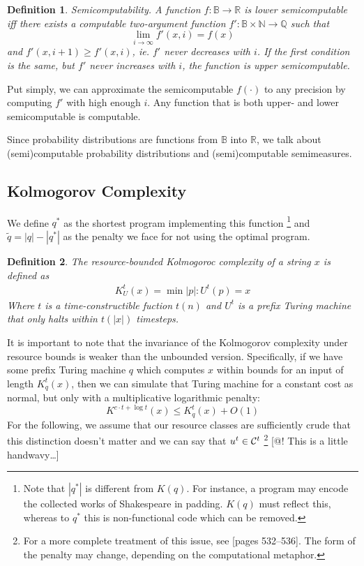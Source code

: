 \documentclass[10pt,a4paper,oneside]{article}
\newtheorem{dfn}{Definition}
\begin{document}
\begin{dfn}
Semicomputability. A function $f : {\mathbb B} \rightarrow {\mathbb R}$ is \emph{lower semicomputable} iff there exists a computable two-argument function $f': {\mathbb B} \times {\mathbb N} \rightarrow \mathbb Q$ such that  
\[
\lim_{i \rightarrow \infty} f'(x, i) = f(x)
\] and $f'(x, i + 1) \geq f'(x, i)$, ie. $f'$ never decreases with $i$. If the first condition is the same, but $f'$ never \emph{increases} with $i$, the function is \emph{upper semicomputable}.
\end{dfn}

Put simply, we can approximate the semicomputable $f(\cdot)$ to any precision by computing $f'$ with high enough $i$. Any function that is both upper- and lower semicomputable is computable.

Since probability distributions are functions from $\mathbb B$ into $\mathbb R$, we talk about (semi)computable probability distributions and (semi)computable semimeasures.

\subsection*{Kolmogorov Complexity}

We define $q^*$ as the shortest program implementing this function \footnote{Note that $|q^*|$ is different from $K(q)$. For instance, a program may encode the collected works of Shakespeare in padding. $K(q)$ must reflect this, whereas to $q^*$ this is non-functional code which can be removed.} and $\tilde{q} = |q| - |q^*|$ as the penalty we face for not using the optimal program.

\begin{dfn}
The \emph{resource-bounded Kolmogoroc complexity} of a string $x$ is defined as
\begin{align*}
K_U^t(x) = \min{|p| : U^t(p) = x}
\end{align*}
Where $t$ is a time-constructible fuction $t(n)$ and $U^t$ is a prefix Turing machine that only halts within $t(|x|)$ timesteps.
\end{dfn}

It is important to note that the invariance of the Kolmogorov complexity under resource bounds is weaker than the unbounded version. Specifically, if we have some prefix Turing machine $q$ which computes $x$ within bounds for an input of length $K^t_q(x)$, then we can simulate that Turing machine for a constant cost as normal, but only with a multiplicative logarithmic penalty:
\[
K^{c \cdot t + \log t}(x) \leq K^t_q(x) + O(1)
\] 
For the following, we assume that our resource classes are sufficiently crude that this distinction doesn't matter and we can say that $u^t \in {\cal C}^t$ \footnote{For a more complete treatment of this issue, see \cite{li1993introduction}[pages 532--536]. The form of the penalty may change, depending on the computational metaphor.} [@! This is a little handwavy\ldots]
\end{document}
